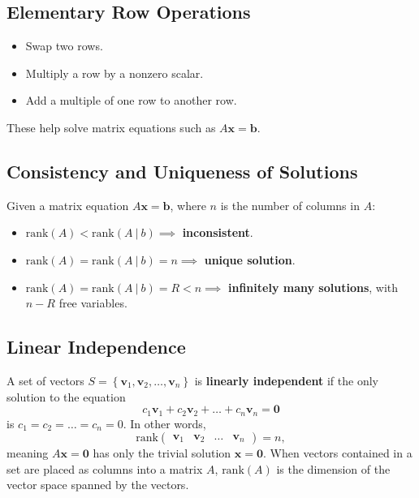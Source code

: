 \subsection{Elementary Row Operations}

\begin{itemize}
    \item Swap two rows.
    \item Multiply a row by a nonzero scalar.
    \item Add a multiple of one row to another row.
\end{itemize}

These help solve matrix equations such as $A\mathbf{x} = \mathbf{b}$.

\subsection{Consistency and Uniqueness of Solutions}

Given a matrix equation $A\mathbf{x}=\mathbf{b}$, where $n$ is the number of columns in $A$:
\begin{itemize}
    \item $\text{rank}(A) < \text{rank}(A~|~b) \implies$ \textbf{inconsistent}.
    \item $\text{rank}(A) = \text{rank}(A~|~b) = n \implies$ \textbf{unique solution}.
    \item $\text{rank}(A) = \text{rank}(A~|~b) = R < n \implies$ \textbf{infinitely many solutions}, with $n-R$ free variables.
\end{itemize}

\subsection{Linear Independence}

A set of vectors $S = \left\{\mathbf{v}_1, \mathbf{v}_2, \dots, \mathbf{v}_n\right\}$ is \textbf{linearly independent} if the only solution to the equation
\begin{equation*}
    c_1\mathbf{v}_1 + c_2\mathbf{v}_2 + \dots + c_n\mathbf{v}_n = \mathbf{0}
\end{equation*}
is $c_1 = c_2 = \dots = c_n = 0$. In other words,
\begin{equation*}
    \text{rank}\begin{pmatrix} \mathbf{v}_1 & \mathbf{v}_2 & \dots & \mathbf{v}_n \end{pmatrix} = n,
\end{equation*}
meaning $A\mathbf{x} = \mathbf{0}$ has only the trivial solution $\mathbf{x} = \mathbf{0}$. When vectors contained in a set are placed as columns into a matrix $A$, $\text{rank}(A)$ is the dimension of the vector space spanned by the vectors.


